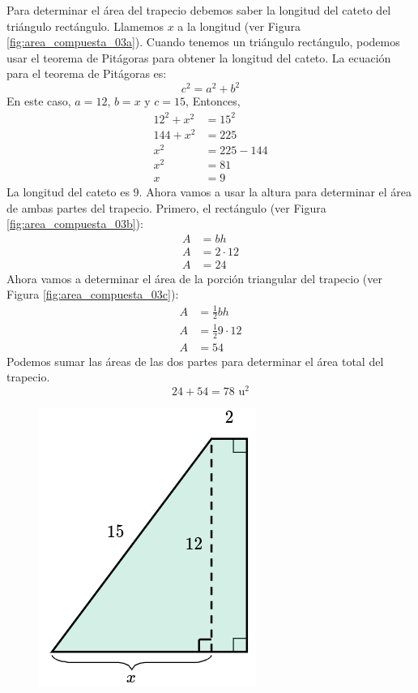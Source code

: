 \begin{solutionbox}{15cm}
    \begin{minipage}{0.7\textwidth}
        Para determinar el área del trapecio debemos saber la longitud del cateto del triángulo rectángulo. Llamemos $x$ a la longitud (ver Figura \ref{fig:area_compuesta_03a}).
        Cuando tenemos un triángulo rectángulo, podemos usar el teorema de Pitágoras para obtener la longitud del cateto.
        La ecuación para el teorema de Pitágoras es:
        \[c^2=a^2+b^2\]
        En este caso, $a=12$, $b=x$ y $c=15$, Entonces,
        \begin{align*}
            12^2+x^2 & =15^2    \\
            144+x^2  & =225     \\
            x^2      & =225-144 \\
            x^2      & =81      \\
            x        & =9
        \end{align*}
        La longitud del cateto es 9. Ahora vamos a usar la altura para determinar el área de ambas partes del trapecio.
        Primero, el rectángulo (ver Figura \ref{fig:area_compuesta_03b}):
        \begin{align*}
            A & =bh        \\
            A & =2\cdot 12 \\
            A & =24
        \end{align*}
        Ahora vamos a determinar el área de la porción triangular del trapecio (ver Figura \ref{fig:area_compuesta_03c}):
        \begin{align*}
            A & =\frac{1}{2}bh        \\
            A & =\frac{1}{2}9\cdot 12 \\
            A & =54
        \end{align*}
        Podemos sumar las áreas de las dos partes para determinar el área total del trapecio.
        \[24+54=78 \text{ u}^2\]
    \end{minipage}\hfill
    \begin{minipage}{0.25\textwidth}
        \begin{figure}[H]
            \centering
            \includegraphics[width=0.5\linewidth]{../images/area_compuesta_03a.png}

\end{figure}
\end{minipage}
\end{solutionbox}

